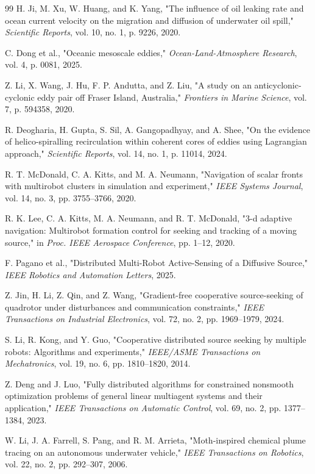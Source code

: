 \documentclass[lettersize,journal]{IEEEtran}
\begin{document}
\begin{thebibliography}{99}
 H. Ji, M. Xu, W. Huang, and K. Yang, "The influence of oil leaking rate and ocean current velocity on the migration and diffusion of underwater oil spill," \textit{Scientific Reports}, vol. 10, no. 1, p. 9226, 2020.

 C. Dong et al., "Oceanic mesoscale eddies," \textit{Ocean-Land-Atmosphere Research}, vol. 4, p. 0081, 2025.

 Z. Li, X. Wang, J. Hu, F. P. Andutta, and Z. Liu, "A study on an anticyclonic-cyclonic eddy pair off Fraser Island, Australia," \textit{Frontiers in Marine Science}, vol. 7, p. 594358, 2020.

 R. Deogharia, H. Gupta, S. Sil, A. Gangopadhyay, and A. Shee, "On the evidence of helico-spiralling recirculation within coherent cores of eddies using Lagrangian approach," \textit{Scientific Reports}, vol. 14, no. 1, p. 11014, 2024.

 R. T. McDonald, C. A. Kitts, and M. A. Neumann, "Navigation of scalar fronts with multirobot clusters in simulation and experiment," \textit{IEEE Systems Journal}, vol. 14, no. 3, pp. 3755--3766, 2020.

 R. K. Lee, C. A. Kitts, M. A. Neumann, and R. T. McDonald, "3-d adaptive navigation: Multirobot formation control for seeking and tracking of a moving source," in \textit{Proc. IEEE Aerospace Conference}, pp. 1--12, 2020.

 F. Pagano et al., "Distributed Multi-Robot Active-Sensing of a Diffusive Source," \textit{IEEE Robotics and Automation Letters}, 2025.

 Z. Jin, H. Li, Z. Qin, and Z. Wang, "Gradient-free cooperative source-seeking of quadrotor under disturbances and communication constraints," \textit{IEEE Transactions on Industrial Electronics}, vol. 72, no. 2, pp. 1969--1979, 2024.

 S. Li, R. Kong, and Y. Guo, "Cooperative distributed source seeking by multiple robots: Algorithms and experiments," \textit{IEEE/ASME Transactions on Mechatronics}, vol. 19, no. 6, pp. 1810--1820, 2014.

 Z. Deng and J. Luo, "Fully distributed algorithms for constrained nonsmooth optimization problems of general linear multiagent systems and their application," \textit{IEEE Transactions on Automatic Control}, vol. 69, no. 2, pp. 1377--1384, 2023.

 W. Li, J. A. Farrell, S. Pang, and R. M. Arrieta, "Moth-inspired chemical plume tracing on an autonomous underwater vehicle," \textit{IEEE Transactions on Robotics}, vol. 22, no. 2, pp. 292--307, 2006.


\end{thebibliography}
\end{document}
